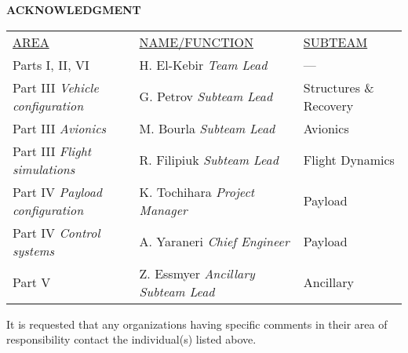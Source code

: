 
\begin{center}
	{\Large\textbf{ACKNOWLEDGMENT}}\\
	\begin{minipage}[H]{0.75\linewidth}
		\begin{table}[H]
			\begin{tabularx}{\linewidth}{X X l}
				\underline{AREA} & \underline{NAME/FUNCTION} & \underline{SUBTEAM} \\[.75em]
				Parts I, II, VI & H. El-Kebir \newline \textit{Team Lead} & --- \\[1.5em]
				Part III \newline \textit{Vehicle configuration} & G. Petrov \newline \textit{Subteam Lead} & Structures \& Recovery \\[1.5em]
				Part III  \newline \textit{Avionics} & M. Bourla \newline \textit{Subteam Lead} & Avionics \\[1.5em]
				Part III  \newline \textit{Flight simulations} & R. Filipiuk \newline \textit{Subteam Lead} & Flight Dynamics \\[1.5em]
				Part IV \newline \textit{Payload configuration} & K. Tochihara \newline \textit{Project Manager} & Payload \\[1.5em]
				Part IV \newline \textit{Control systems} & A. Yaraneri \newline \textit{Chief Engineer} & Payload \\[1.5em]
				Part V & Z. Essmyer \newline \textit{Ancillary Subteam Lead} & Ancillary
			\end{tabularx}
		\end{table}
	
		It is requested that any organizations having specific comments in their area of responsibility contact the individual(s) listed above.
	\end{minipage}
\end{center}
\vfill

\newpage